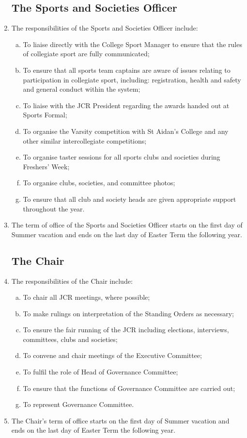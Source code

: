 \documentclass[12pt]{article}
\begin{document}
\begin{enumerate}
    \subsection{The Sports and Societies Officer}
    \item The responsibilities of the Sports and Societies Officer include:
    \begin{enumerate}[(a)]
        \item To liaise directly with the College Sport Manager to ensure that the rules of collegiate sport are fully communicated;
        \item To ensure that all sports team captains are aware of issues relating to participation in collegiate sport, including: registration, health and safety and general conduct within the system;
        \item To liaise with the JCR President regarding the awards handed out at Sports Formal;
        \item To organise the Varsity competition with St Aidan's College and any other similar intercollegiate competitions;
        \item To organise taster sessions for all sports clubs and societies during Freshers' Week;
        \item To organise clubs, societies, and committee photos;
        \item To ensure that all club and society heads are given appropriate support throughout the year.
    \end{enumerate}
    \item The term of office of the Sports and Societies Officer starts on the first day of Summer vacation and ends on the last day of Easter Term the following year.
    \subsection{The Chair}
    \item The responsibilities of the Chair include:
    \begin{enumerate}[(a)]
        \item To chair all JCR meetings, where possible;
        \item To make rulings on interpretation of the Standing Orders as necessary;
        \item To ensure the fair running of the JCR including elections, interviews, committees, clubs and societies;
        \item To convene and chair meetings of the Executive Committee;
        \item To fulfil the role of Head of Governance Committee;
        \item To ensure that the functions of Governance Committee are carried out;
        \item To represent Governance Committee.
    \end{enumerate}
    \item The Chair's term of office starts on the first day of Summer vacation and ends on the last day of Easter Term the following year.
\end{enumerate}
\newpage
\end{document}
